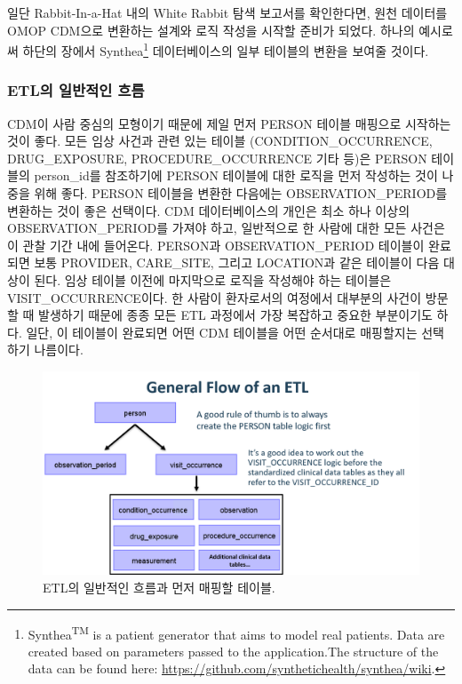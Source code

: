 \documentclass[10.5pt]{book}
\let\rmarkdownfootnote\footnote%
\def\footnote{\protect\rmarkdownfootnote}
\theoremstyle{definition}
\theoremstyle{definition}
\theoremstyle{definition}
\theoremstyle{remark}
\begin{document}
일단 Rabbit-In-a-Hat 내의 White Rabbit 탐색 보고서를 확인한다면, 원천
데이터를 OMOP CDM으로 변환하는 설계와 로직 작성을 시작할 준비가 되었다.
하나의 예시로써 하단의 장에서 Synthea\footnote{Synthea\textsuperscript{TM}
  is a patient generator that aims to model real patients. Data are
  created based on parameters passed to the application.The structure of
  the data can be found here:
  \url{https://github.com/synthetichealth/synthea/wiki}.} 데이터베이스의
일부 테이블의 변환을 보여줄 것이다.

\subsubsection*{ETL의 일반적인 흐름}\label{etl--}

CDM이 사람 중심의 모형이기 때문에 제일 먼저 PERSON 테이블 매핑으로
시작하는 것이 좋다. 모든 임상 사건과 관련 있는 테이블
(CONDITION\_OCCURRENCE, DRUG\_EXPOSURE, PROCEDURE\_OCCURRENCE 기타 등)은
PERSON 테이블의 person\_id를 참조하기에 PERSON 테이블에 대한 로직을 먼저
작성하는 것이 나중을 위해 좋다. PERSON 테이블을 변환한 다음에는
OBSERVATION\_PERIOD를 변환하는 것이 좋은 선택이다. CDM 데이터베이스의
개인은 최소 하나 이상의 OBSERVATION\_PERIOD를 가져야 하고, 일반적으로 한
사람에 대한 모든 사건은 이 관찰 기간 내에 들어온다. PERSON과
OBSERVATION\_PERIOD 테이블이 완료되면 보통 PROVIDER, CARE\_SITE, 그리고
LOCATION과 같은 테이블이 다음 대상이 된다. 임상 테이블 이전에 마지막으로
로직을 작성해야 하는 테이블은 VISIT\_OCCURRENCE이다. 한 사람이
환자로서의 여정에서 대부분의 사건이 방문할 때 발생하기 때문에 종종 모든
ETL 과정에서 가장 복잡하고 중요한 부분이기도 하다. 일단, 이 테이블이
완료되면 어떤 CDM 테이블을 어떤 순서대로 매핑할지는 선택하기 나름이다.

\begin{figure}

{\centering \includegraphics[width=1\linewidth]{images/ExtractTransformLoad/flowOfEtl} 

}

\caption{ETL의 일반적인 흐름과 먼저 매핑할 테이블.}\label{fig:etlFlow}
\end{figure}
\end{document}
